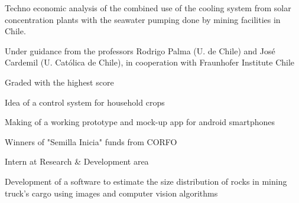 Techno economic analysis of the combined use of the cooling system from solar concentration plants with the seawater pumping done by mining facilities in Chile. 
\begin{tightemize}
\item Under guidance from the professors Rodrigo Palma (U. de Chile) and José Cardemil (U. Católica de Chile), in cooperation with Fraunhofer Institute Chile
\item Graded with the highest score
\end{tightemize}
\sectionsep
{}
Idea of a control system for household crops
\begin{tightemize}
\item Making of a working prototype and mock-up app for android smartphones
\item Winners of "Semilla Inicia" funds from CORFO
\end{tightemize}
\sectionsep

Intern at Research \& Development area
\begin{tightemize}
\item Development of a software to estimate the size distribution of rocks in mining truck's cargo using images and computer vision algorithms 
\end{tightemize}
\sectionsep

